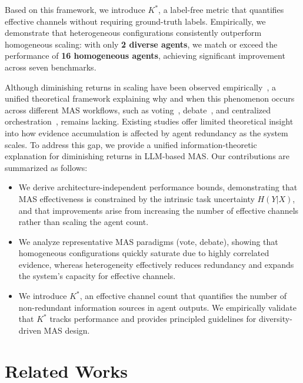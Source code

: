 \documentclass{article}
\theoremstyle{plain}
\theoremstyle{definition}
\theoremstyle{remark}
\begin{document}
Based on this framework, we introduce $K^*$, a label-free metric that quantifies effective channels without requiring ground-truth labels. Empirically, we demonstrate that heterogeneous configurations consistently outperform homogeneous scaling: with only \textbf{2 diverse agents}, we match or exceed the performance of \textbf{16 homogeneous agents}, achieving significant improvement across seven benchmarks.

Although diminishing returns in scaling have been observed empirically~\citep{wang2024a, kim2025sciencescalingagentsystems}, a unified theoretical framework explaining why and when this phenomenon occurs across different MAS workflows, such as voting~\citep{wang2023selfconsistencyimproveschainthought}, debate~\citep{du2023improvingfactualityreasoninglanguage, 10.5555/3692070.3693020}, and centralized orchestration~\citep{hong2024metagptmetaprogrammingmultiagent}, remains lacking. Existing studies offer limited theoretical insight into how evidence accumulation is affected by agent redundancy as the system scales.
To address this gap, we provide a unified information-theoretic explanation for diminishing returns in LLM-based MAS. Our contributions are summarized as follows:
\vspace{-0.3cm}
\begin{itemize}[leftmargin=1.5em] \setlength{\itemsep}{-0.1em}
    \item We derive architecture-independent performance bounds, demonstrating that MAS effectiveness is constrained by the intrinsic task uncertainty $H(Y|X)$, and that improvements arise from increasing the number of effective channels rather than scaling the agent count.
    \item We analyze representative MAS paradigms (vote, debate), showing that homogeneous configurations quickly saturate due to highly correlated evidence, whereas heterogeneity effectively reduces redundancy and expands the system's capacity for effective channels.
    \item We introduce $K^*$, an effective channel count that quantifies the number of non-redundant information sources in agent outputs. We empirically validate that $K^*$ tracks performance and provides principled guidelines for diversity-driven MAS design.
\end{itemize}




\section{Related Works}
\end{document}
